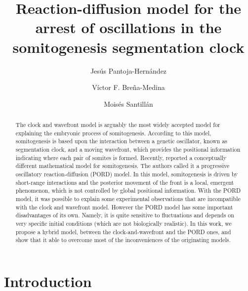 \documentclass[%
 preprint,
 amsmath,amssymb,
 aps,
]{revtex4-2}
\begin{document}
\title{Reaction-diffusion model for the arrest of oscillations in the
	somitogenesis segmentation clock}

\author{Jes\'us Pantoja-Hern\'andez}

\author{V\'ictor F. Bre\~na-Medina}

\author{Mois\'es Santill\'an}


	\begin{abstract}
	The clock and wavefront model is arguably the most widely accepted model for explaining the embryonic process of somitogenesis. According to this model, somitogenesis is based upon the interaction between a genetic oscillator, known as segmentation clock, and a moving wavefront, which provides the positional information indicating where each pair of somites is formed. Recently, \citet{Cotterell2015} reported a conceptually different mathematical model for somitogenesis. The authors called it a progressive oscillatory reaction-diffusion (PORD) model. In this model, somitogenesis is driven by short-range interactions and the posterior movement of the front is a local, emergent phenomenon, which is not controlled by global positional information. With the PORD model, it was possible to explain some experimental observations that are incompatible with the clock and wavefront model. However the PORD model has some important disadvantages of its own. Namely, it is quite sensitive to fluctuations and depends on very specific initial conditions (which are not biologically realistic). In this work, we propose a hybrid model, between the clock-and-wavefront and the PORD ones, and show that it able to overcome most of the inconveniences of the originating models.
	\end{abstract}
	
	\maketitle


	\section{Introduction}
	\label{intro}
	
\end{document}
